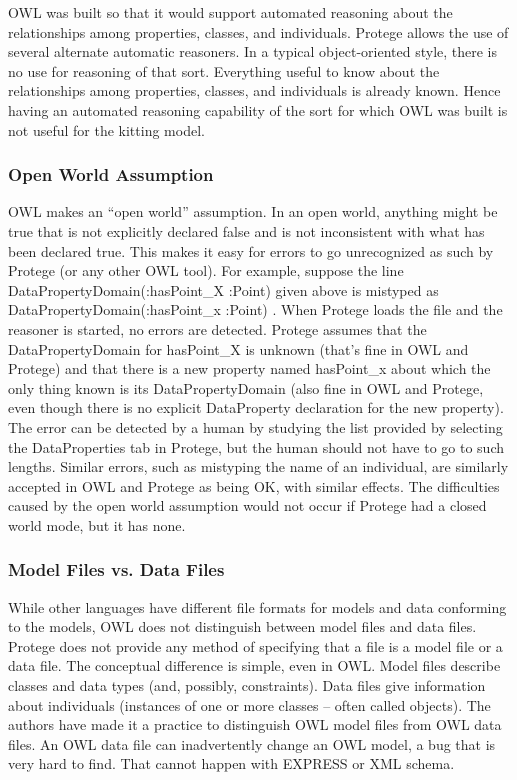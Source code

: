 OWL was built so that it would support automated reasoning about the
relationships among properties, classes, and individuals. Protege allows
the use of several alternate automatic reasoners. In a typical
object-oriented style, there is no use for reasoning of that sort.
Everything useful to know about the relationships among properties,
classes, and individuals is already known. Hence having an automated
reasoning capability of the sort for which OWL was built is not useful
for the kitting model.\\

\subsubsection{Open World Assumption}

OWL makes an ``open world'' assumption.  In an open world, anything might
be true that is not explicitly declared false and is not inconsistent with
what has been declared true. This makes it easy for errors to go
unrecognized as such by Protege (or any other OWL tool). For example,
suppose the line \sf DataPropertyDomain(:hasPoint\_X :Point) \rm given
above is mistyped as \sf DataPropertyDomain(:hasPoint\_x :Point) \rm. When
Protege loads the file and the reasoner is started, no errors are
detected. Protege assumes that the DataPropertyDomain for \sf hasPoint\_X
\rm is unknown (that's fine in OWL and Protege) and that there is a new
property named \sf hasPoint\_x \rm about which the only thing known is its
DataPropertyDomain (also fine in OWL and Protege, even though there is no
explicit DataProperty declaration for the new property). The error can be
detected by a human by studying the list provided by selecting the
DataProperties tab in Protege, but the human should not have to go to such
lengths. Similar errors, such as mistyping the name of an individual, are
similarly accepted in OWL and Protege as being OK, with similar effects.
The difficulties caused by the open world assumption would not occur if
Protege had a closed world mode, but it has none.\\

\subsubsection{Model Files vs. Data Files}

While other languages have different file formats for models and
data conforming to the models, OWL does not distinguish between model files
and data files. Protege does not provide any method of specifying that a
file is a model file or a data file. The conceptual difference is simple,
even in OWL. Model files describe classes and data types (and, possibly,
constraints). Data files give information about individuals (instances of
one or more classes -- often called objects). The authors have made it a
practice to distinguish OWL model files from OWL data files. An OWL data
file can inadvertently change an OWL model, a bug that is very hard to
find. That cannot happen with EXPRESS or XML schema.\\


